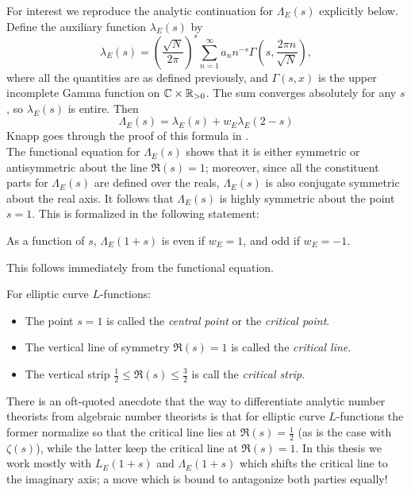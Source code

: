 \documentclass[10pt]{article}
\newcommand{\Lams}{\Lambda_E(s)}
\begin{document}
For interest we reproduce the analytic continuation for $\Lams$ explicitly below. Define the auxiliary function $\lambda_E(s)$ by
\begin{equation}
\lambda_E(s) = \left(\frac{\sqrt{N}}{2\pi}\right)^{s} \sum_{n=1}^\infty a_n n^{-s}\Gamma \left(s,\frac{2\pi n}{\sqrt{N}}\right),
\end{equation}
where all the quantities are as defined previously, and $\Gamma(s,x)$ is the upper incomplete Gamma function on $\mathbb{C}\times \mathbb{R}_{>0}$. The sum converges absolutely for any $s$, so $\lambda_E(s)$ is entire. Then
\begin{equation}
\Lambda_E(s) = \lambda_E(s) + w_E \lambda_E(2-s)
\end{equation}
Knapp goes through the proof of this formula in \cite[pp. 270-271]{Kna-1992}. \\

The functional equation for $\Lams$ shows that it is either symmetric or antisymmetric about the line $\Re(s) = 1$; moreover, since all the constituent parts for $\Lams$ are defined over the reals, $\Lams$ is also conjugate symmetric about the real axis. It follows that $\Lams$ is highly symmetric about the point $s=1$. This is formalized in the following statement:
\begin{proposition}
As a function of $s$, $\Lambda_E(1+s)$ is even if $w_E=1$, and odd if $w_E = -1$.
\end{proposition}
This follows immediately from the functional equation. \\

\begin{definition} For elliptic curve $L$-functions:
\begin{itemize}
\item The point $s=1$ is called the {\it central point} or the {\it critical point}.
\item The vertical line of symmetry $\Re(s)=1$ is called the {\it critical line}.
\item The vertical strip $\frac{1}{2} \le \Re(s) \le \frac{3}{2}$ is call the {\it critical strip}.
\end{itemize}
\end{definition}

There is an oft-quoted anecdote that the way to differentiate analytic number theorists from algebraic number theorists is that for elliptic curve $L$-functions the former normalize so that the critical line lies at $\Re(s) = \frac{1}{2}$ (as is the case with $\zeta(s)$), while the latter keep the critical line at $\Re(s)=1$. In this thesis we work mostly with $L_E(1+s)$ and $\Lambda_E(1+s)$ which shifts the critical line to the imaginary axis; a move which is bound to antagonize both parties equally! \\
\end{document}
